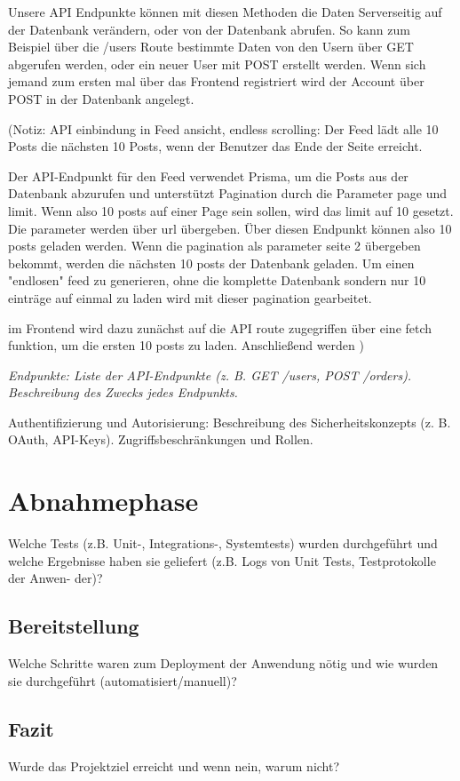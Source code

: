 \documentclass[a4paper,12pt]{article}
\begin{document}
Unsere API Endpunkte können mit diesen Methoden die Daten Serverseitig auf der Datenbank verändern, oder von der Datenbank abrufen. So kann zum Beispiel über die /users Route bestimmte Daten von den Usern über GET abgerufen werden, oder ein neuer User mit POST erstellt werden. Wenn sich jemand zum ersten mal über das Frontend registriert wird der Account über POST in der Datenbank angelegt.

(Notiz: API einbindung in Feed ansicht, endless scrolling: 
 Der Feed lädt alle 10 Posts die nächsten 10 Posts, wenn der Benutzer das Ende der Seite erreicht. 
 
 Der API-Endpunkt für den Feed verwendet Prisma, um die Posts aus der Datenbank abzurufen und unterstützt Pagination durch die Parameter page und limit. Wenn also 10 posts auf einer Page sein sollen, wird das limit auf 10 gesetzt. Die parameter werden über url übergeben. 
 Über diesen Endpunkt können also 10 posts geladen werden. Wenn die pagination als parameter seite 2 übergeben bekommt, werden die nächsten 10 posts der Datenbank geladen. Um einen "endlosen" feed zu generieren, ohne die komplette Datenbank sondern nur 10 einträge auf einmal zu laden wird mit dieser pagination gearbeitet. 
 
 im Frontend wird dazu zunächst auf die API route zugegriffen über eine fetch funktion, um die ersten 10 posts zu laden. Anschließend werden 
 ) 

\textit{Endpunkte: Liste der API-Endpunkte (z. B. GET /users, POST /orders).
Beschreibung des Zwecks jedes Endpunkts.}

Authentifizierung und Autorisierung: Beschreibung des Sicherheitskonzepts (z. B.
OAuth, API-Keys).  Zugriffsbeschränkungen und Rollen.

\newpage \section{Abnahmephase}
Welche Tests (z.B. Unit-, Integrations-,
Systemtests) wurden durchgeführt und welche Ergebnisse haben sie geliefert
(z.B. Logs von Unit Tests, Testprotokolle der Anwen- der)?

\subsection{Bereitstellung}
Welche Schritte waren zum Deployment der Anwendung
nötig und wie wurden sie durchgeführt (automatisiert/manuell)?

\subsection{Fazit}
Wurde das Projektziel erreicht und wenn nein, warum nicht?
\end{document}
